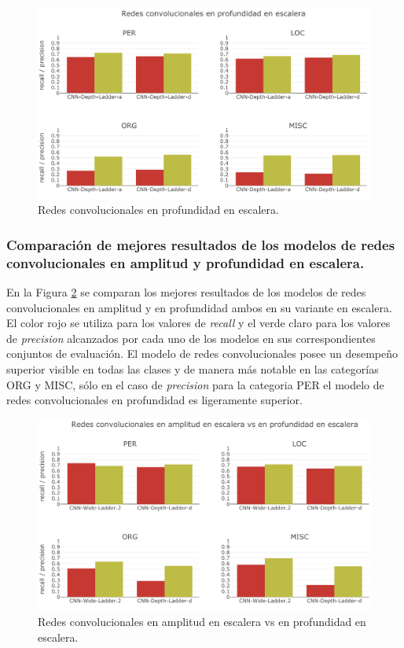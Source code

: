 \begin{figure}[H]
\begin{center}
\includegraphics[width=.9\linewidth]{images/CNN_depth_ladder_precision_recall.png}
\caption{Redes convolucionales en profundidad en escalera.}
\label{fig:CNN_depth_ladder_precision_recall}
\end{center}
\end{figure}

\subsubsection{Comparación de mejores resultados de los modelos de redes convolucionales en amplitud y profundidad en escalera.}

En la Figura \ref{fig:CNN_wide_depth_ladder_precision_recall} se comparan los mejores resultados de los modelos de redes convolucionales en amplitud y en profundidad ambos en su variante en escalera. El color rojo se utiliza para los valores de \textit{recall} y el verde claro para los valores de \textit{precision} alcanzados por cada uno de los modelos en sus correspondientes conjuntos de evaluación. El modelo de redes convolucionales posee un desempeño superior visible en todas las clases y de manera más notable en las categorías ORG y MISC, sólo en el caso de \textit{precision} para la categoria PER el modelo de redes convolucionales en profundidad es ligeramente superior.

\begin{figure}[H]
\begin{center}
\includegraphics[width=.9\linewidth]{images/CNN_wide_depth_ladder_precision_recall.png}
\caption{Redes convolucionales en amplitud en escalera vs en profundidad en escalera.}
\label{fig:CNN_wide_depth_ladder_precision_recall}
\end{center}
\end{figure}

